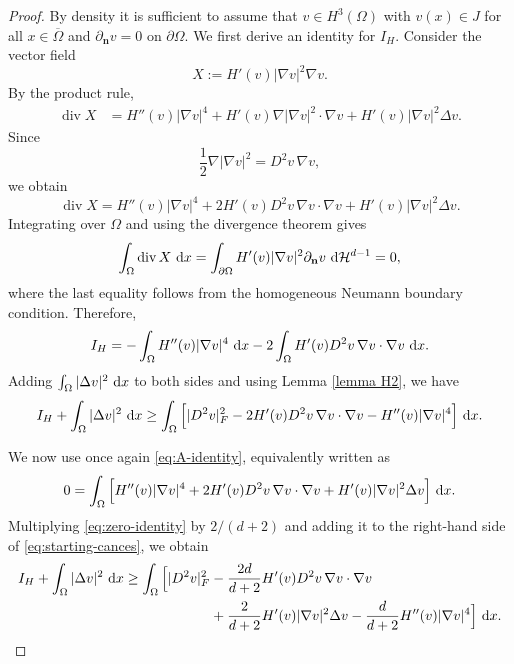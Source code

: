 \documentclass[11pt,  reqno]{amsart}%
\theoremstyle{plain}
\theoremstyle{definition}
\theoremstyle{remark}
\numberwithin{equation}{section}
\newcommand{\dx}{\textup{d}x}
\begin{document}
\begin{proof}
By density it is sufficient to assume that $v \in H^3(\Omega)$ with 
$v(x)\in J$ for all $x\in\overline{\Omega}$ and
$\partial_{\mathbf{n}} v=0$ on $\partial \Omega$.
We first derive an identity for $I_H$. Consider the vector field
\[
    X:=H'(v)|\nabla v|^2\nabla v.
\]
By the product rule,
\begin{align*}
    \operatorname{div}X
    &=
    H''(v)|\nabla v|^4
    +
    H'(v)\nabla|\nabla v|^2\cdot\nabla v
    +
    H'(v)|\nabla v|^2\Delta v.
\end{align*}
Since
\[
    \frac12\nabla|\nabla v|^2=D^2v\,\nabla v,
\]
we obtain
\[
    \operatorname{div}X
    =
    H''(v)|\nabla v|^4
    +
    2H'(v)  D^2v\,\nabla v \cdot \nabla v
    +
    H'(v)|\nabla v|^2\Delta v.
\]
Integrating over $\Omega$ and using the divergence theorem gives
\[
    \int_\Omega\operatorname{div}X\ \dx
    =
    \int_{\partial\Omega}
    H'(v)|\nabla v|^2\partial_{\mathbf{n}} v\ 
    \mathrm{d}\mathcal H^{d-1}
    =
    0,
\]
where the last equality follows from the homogeneous Neumann boundary
condition. Therefore,
\begin{equation}
\label{eq:A-identity}
    I_H
    =
    -\int_\Omega H''(v)|\nabla v|^4\ \dx
    -
    2\int_\Omega
    H'(v)
     D^2v\,\nabla v \cdot \nabla v \ \dx.
\end{equation}
Adding $\int_\Omega|\Delta v|^2\ \dx$ to both sides and using Lemma \ref{lemma H2}, we have
\begin{align}
    I_H+\int_\Omega|\Delta v|^2\ \dx
    \geq
    \int_\Omega
    \Big[
        |D^2v|_F^2
        -
        2H'(v)
         D^2v\,\nabla v \cdot \nabla v
        -H''(v)|\nabla v|^4
    \Big] \ \dx.
\label{eq:starting-cances}
\end{align}

We now use once again \eqref{eq:A-identity}, equivalently written as
\begin{equation}
\label{eq:zero-identity}
    0
    =
    \int_\Omega
    \Big[
        H''(v)|\nabla v|^4
        +
        2H'(v)
        D^2v\,\nabla v \cdot \nabla v
        +
        H'(v)|\nabla v|^2\Delta v
    \Big]\ \dx.
\end{equation}
Multiplying \eqref{eq:zero-identity} by $2/(d+2)$ and adding it to
the right-hand side of \eqref{eq:starting-cances}, we obtain
\begin{align}
    I_H+\int_\Omega|\Delta v|^2\ \dx
    \geq
    \int_\Omega
    \Big[
        |D^2v|_F^2
        &-
        \frac{2d}{d+2}
        H'(v)
         D^2v\,\nabla v \cdot \nabla v 
        \nonumber\\
        &+
        \frac{2}{d+2}
        H'(v)|\nabla v|^2\Delta v
        -
        \frac{d}{d+2}
        H''(v)|\nabla v|^4
    \Big] \ \dx.
\label{eq:cances-combination}
\end{align}


\end{proof}
\end{document}
